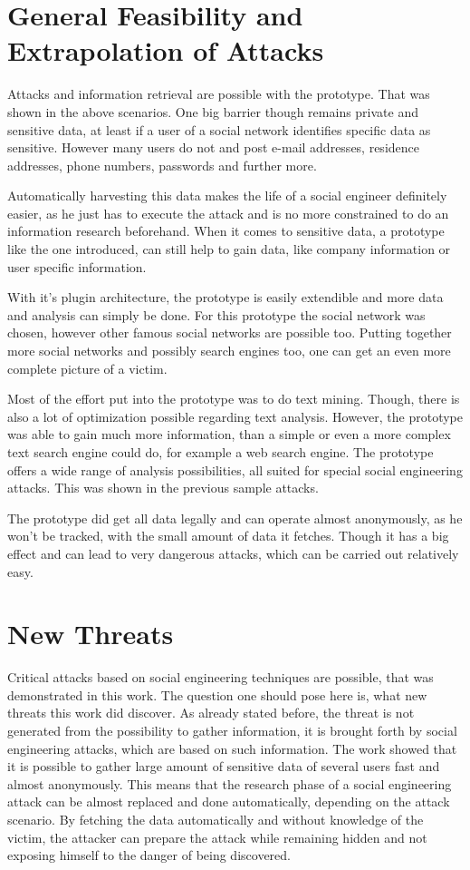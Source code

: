 \section{General Feasibility and Extrapolation of Attacks}

Attacks and information retrieval are possible with the prototype. That was
shown in the above scenarios. One big barrier though remains private and
sensitive data, at least if a user of a social network identifies specific data
as sensitive. However many users do not and post e-mail addresses, residence
addresses, phone numbers, passwords and further more.

Automatically harvesting this data makes the life of a social engineer
definitely easier, as he just has to execute the attack and is no more
constrained to do an information research beforehand. When it comes to
sensitive data, a prototype like the one introduced, can still help to gain
data, like company information or user specific information.

With it's plugin architecture, the prototype is easily extendible and more data
and analysis can simply be done. For this prototype the \Twitter{} social
network was chosen, however other famous social networks are possible too.
Putting together more social networks and possibly search engines too, one can
get an even more complete picture of a victim.

Most of the effort put into the prototype was to do text mining. Though, there is
also a lot of optimization possible regarding text analysis. However, the
prototype was able to gain much more information, than a simple or even a more
complex text search engine could do, for example a web search engine. The prototype
offers a wide range of analysis possibilities, all suited for special social
engineering attacks. This was shown in the previous sample attacks.

The prototype did get all data legally and can operate almost anonymously, as
he won't be tracked, with the small amount of data it fetches. Though it has
a big effect and can lead to very dangerous attacks, which can be carried out
relatively easy.

\section{New Threats}

Critical attacks based on social engineering techniques are possible, that was
demonstrated in this work. The question one should pose here is, what new
threats this work did discover. As already stated before, the threat is not
generated from the possibility to gather information, it is brought forth by
social engineering attacks, which are based on such information. The work
showed that it is possible to gather large amount of sensitive data of several
users fast and almost anonymously. This means that the research phase of a
social engineering attack can be almost replaced and done automatically,
depending on the attack scenario. By fetching the data automatically and
without knowledge of the victim, the attacker can prepare the attack while
remaining hidden and not exposing himself to the danger of being discovered.

